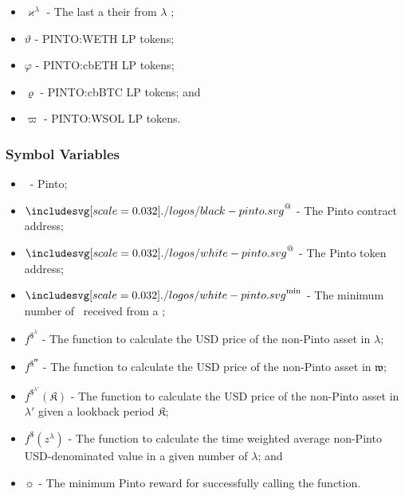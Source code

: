 \documentclass[class=article, crop=false]{standalone}
\begin{document}
\begin{itemize}[topsep=0pt, itemsep=3pt,leftmargin=16pt]
    \item[] $\varkappa^{\lambda}$ - The last  a   their  from $\lambda$ ; 
    \item[] $\vartheta$ - PINTO:WETH LP tokens;
    \item[] $\varphi$ - PINTO:cbETH LP tokens;
    \item[] $\varrho$ - PINTO:cbBTC LP tokens; and
    \item[] $\varpi$ - PINTO:WSOL LP tokens.
\end{itemize}


\subsubsection{Symbol Variables}

\begin{itemize}[topsep=0pt, itemsep=3pt,leftmargin=16pt]
    \item[] \Pinto\ - Pinto;
    \item[] $\PintoContract^{@}$ - The Pinto contract address;
    \item[] $\Pinto^{@}$ - The Pinto token address;
    \item[] $\Pinto^{\text{min}}$ - The minimum number of \Pinto\ received from a ;
    \item[] $f^{\$^{\lambda}}$ - The function to calculate the USD price of the non-Pinto asset in $\lambda$;
    \item[] $f^{\$^\mathfrak{w}}$ - The function to calculate the USD price of the non-Pinto asset in $\mathfrak{w}$;
    \item[] $f^{\$^{\lambda'}}(\mathfrak{K})$ - The function to calculate the USD price of the non-Pinto asset in $\lambda'$ given a lookback period $\mathfrak{K}$;
    \item [] $f^{\$}(z^{\lambda})$ - The function to calculate the time weighted average non-Pinto USD-denominated value in a given number of  $\lambda$; and
    \item[] $\sun$ - The minimum Pinto reward for successfully calling the  function.
\end{itemize}
\end{document}
